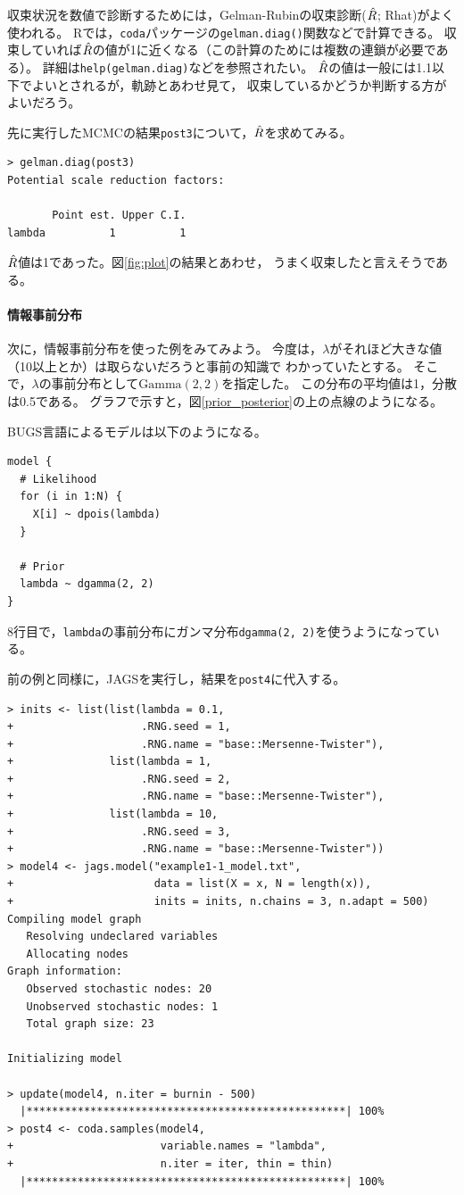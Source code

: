 \documentclass[11pt,uplatex]{jsarticle}
\begin{document}
収束状況を数値で診断するためには，Gelman-Rubinの収束診断($\Hat{R}$; Rhat)がよく使われる。
\textsf{R}では，\texttt{coda}パッケージの\texttt{gelman.diag()}関数などで計算できる。
収束していれば$\Hat{R}$の値が1に近くなる（この計算のためには複数の連鎖が必要である）。
詳細は\texttt{help(gelman.diag)}などを参照されたい。
$\Hat{R}$の値は一般には1.1以下でよいとされるが，軌跡とあわせ見て，
収束しているかどうか判断する方がよいだろう。

先に実行したMCMCの結果\texttt{post3}について，$\Hat{R}$を求めてみる。
\begin{lstlisting}
> gelman.diag(post3)
Potential scale reduction factors:

       Point est. Upper C.I.
lambda          1          1

\end{lstlisting}
$\Hat{R}$値は1であった。図\ref{fig:plot}の結果とあわせ，
うまく収束したと言えそうである。

\paragraph{情報事前分布}

次に，情報事前分布を使った例をみてみよう。
今度は，$\lambda$がそれほど大きな値（10以上とか）は取らないだろうと事前の知識で
わかっていたとする。
そこで，$\lambda$の事前分布として$\mathrm{Gamma}(2, 2)$を指定した。
この分布の平均値は1，分散は0.5である。
グラフで示すと，図\ref{prior_posterior}の上の点線のようになる。

\textsf{BUGS}言語によるモデルは以下のようになる。
\begin{lstlisting}
model {
  # Likelihood
  for (i in 1:N) {
    X[i] ~ dpois(lambda)
  }

  # Prior
  lambda ~ dgamma(2, 2)
}
\end{lstlisting}
8行目で，\texttt{lambda}の事前分布にガンマ分布\texttt{dgamma(2, 2)}を使うようになっている。


前の例と同様に，\textsf{JAGS}を実行し，結果を\texttt{post4}に代入する。
%
\begin{lstlisting}
> inits <- list(list(lambda = 0.1,
+                    .RNG.seed = 1,
+                    .RNG.name = "base::Mersenne-Twister"),
+               list(lambda = 1,
+                    .RNG.seed = 2,
+                    .RNG.name = "base::Mersenne-Twister"),
+               list(lambda = 10,
+                    .RNG.seed = 3,
+                    .RNG.name = "base::Mersenne-Twister"))
> model4 <- jags.model("example1-1_model.txt",
+                      data = list(X = x, N = length(x)),
+                      inits = inits, n.chains = 3, n.adapt = 500)
Compiling model graph
   Resolving undeclared variables
   Allocating nodes
Graph information:
   Observed stochastic nodes: 20
   Unobserved stochastic nodes: 1
   Total graph size: 23

Initializing model

> update(model4, n.iter = burnin - 500)
  |**************************************************| 100%
> post4 <- coda.samples(model4,
+                       variable.names = "lambda",
+                       n.iter = iter, thin = thin)
  |**************************************************| 100%
\end{lstlisting}
\end{document}
